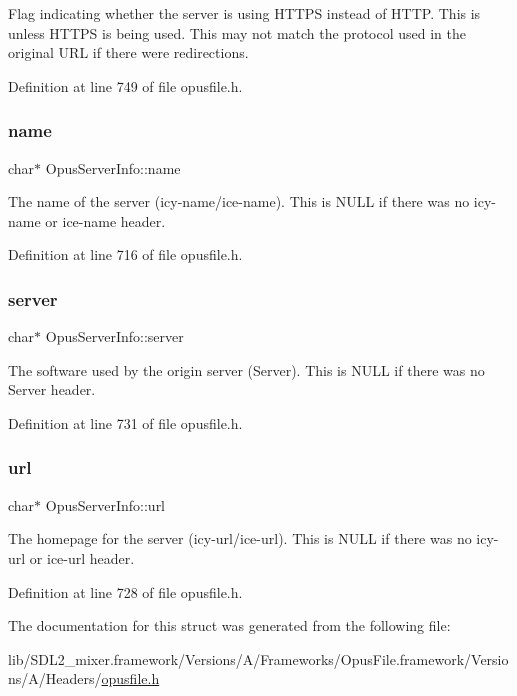 Flag indicating whether the server is using H\+T\+T\+PS instead of H\+T\+TP. This is {} unless H\+T\+T\+PS is being used. This may not match the protocol used in the original U\+RL if there were redirections. 

Definition at line 749 of file opusfile.\+h.

\mbox{\label{struct_opus_server_info_a6c1e013bd64991b75709ef1d76f962b6}} 
\subsubsection{\texorpdfstring{name}{name}}
{\footnotesize\ttfamily char$\ast$ Opus\+Server\+Info\+::name}

The name of the server (icy-\/name/ice-\/name). This is {\ttfamily N\+U\+LL} if there was no {\ttfamily icy-\/name} or {\ttfamily ice-\/name} header. 

Definition at line 716 of file opusfile.\+h.

\mbox{\label{struct_opus_server_info_a7aa583abd214ca9cefab6c1c99097202}} 
\subsubsection{\texorpdfstring{server}{server}}
{\footnotesize\ttfamily char$\ast$ Opus\+Server\+Info\+::server}

The software used by the origin server (Server). This is {\ttfamily N\+U\+LL} if there was no {\ttfamily Server} header. 

Definition at line 731 of file opusfile.\+h.

\mbox{\label{struct_opus_server_info_a7f9aef47413c849bb240ef70394401b1}} 
\subsubsection{\texorpdfstring{url}{url}}
{\footnotesize\ttfamily char$\ast$ Opus\+Server\+Info\+::url}

The homepage for the server (icy-\/url/ice-\/url). This is {\ttfamily N\+U\+LL} if there was no {\ttfamily icy-\/url} or {\ttfamily ice-\/url} header. 

Definition at line 728 of file opusfile.\+h.



The documentation for this struct was generated from the following file\+:\begin{DoxyCompactItemize}
\item 
lib/\+S\+D\+L2\+\_\+mixer.\+framework/\+Versions/\+A/\+Frameworks/\+Opus\+File.\+framework/\+Versions/\+A/\+Headers/\mbox{\hyperlink{opusfile_8h}{opusfile.\+h}}\end{DoxyCompactItemize}
